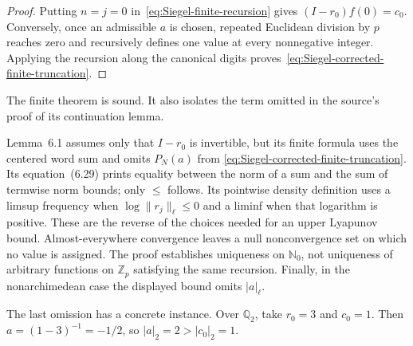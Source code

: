 \begin{proof}
Putting $n=j=0$ in~\eqref{eq:Siegel-finite-recursion} gives
$(I-r_0)f(0)=c_0$.  Conversely, once an admissible $a$ is chosen, repeated
Euclidean division by $p$ reaches zero and recursively defines one value at
every nonnegative integer.  Applying the recursion along the canonical digits
proves~\eqref{eq:Siegel-corrected-finite-truncation}.
\end{proof}

The finite theorem is sound.  It also isolates the term omitted in the
source's proof of its continuation lemma.

\begin{sourceissue}
\label{issue:Siegel-numen-extension}
Lemma~6.1 assumes only that $I-r_0$ is invertible, but its finite formula uses
the centered word sum and omits $P_N(a)$ from
\eqref{eq:Siegel-corrected-finite-truncation}.  Its equation~(6.29) prints
equality between the norm of a sum and the sum of termwise norm bounds; only
$\leq$ follows.  Its pointwise density definition uses a limsup frequency
when $\log\lVert r_j\rVert_\ell\leq0$ and a liminf when that logarithm is
positive.  These are the reverse of the choices needed for an upper Lyapunov
bound.  Almost-everywhere convergence leaves a null nonconvergence set on
which no value is assigned.  The proof establishes uniqueness on
$\mathbb N_0$, not uniqueness of arbitrary functions on $\mathbb Z_p$
satisfying the same recursion.  Finally, in the nonarchimedean case the
displayed bound omits $|a|_\ell$.

The last omission has a concrete instance.  Over $\mathbb Q_2$, take
$r_0=3$ and $c_0=1$.  Then
$a=(1-3)^{-1}=-1/2$, so $|a|_2=2>|c_0|_2=1$.
\end{sourceissue}

